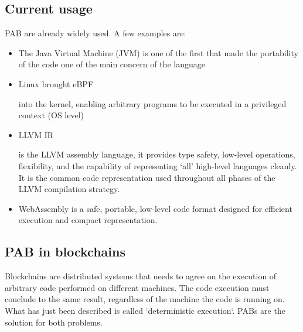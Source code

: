 \documentclass[../main.tex]{subfiles}
\begin{document}
\subsection{Current usage}

PAB are already widely used. A few examples are:

\begin{itemize}
  \item
        The Java Virtual Machine (JVM) is one of the first that made the portability of the code one of the main concern of the language
  \item
        Linux brought eBPF 

        into the kernel, enabling arbitrary programs to be executed in a privileged context (OS level)
  \item
        LLVM IR 
        
        is the LLVM assembly language, it provides type safety, low-level operations, flexibility, and the capability of representing ‘all’ high-level languages cleanly. It is the common code representation used throughout all phases of the LLVM compilation strategy. ~\cite{LLVM}
  \item
        WebAssembly is a safe, portable, low-level code format designed for efficient execution and compact representation. ~\cite{wasm-core-spec}
\end{itemize}

\subsection{PAB in blockchains}

Blockchains are distributed systems that needs to agree on the execution of arbitrary code performed on different machines. The code execution must conclude to the same result, regardless of the machine the code is running on. What has just been described is called `deterministic execution`. PABs are the solution for both problems.
\end{document}
